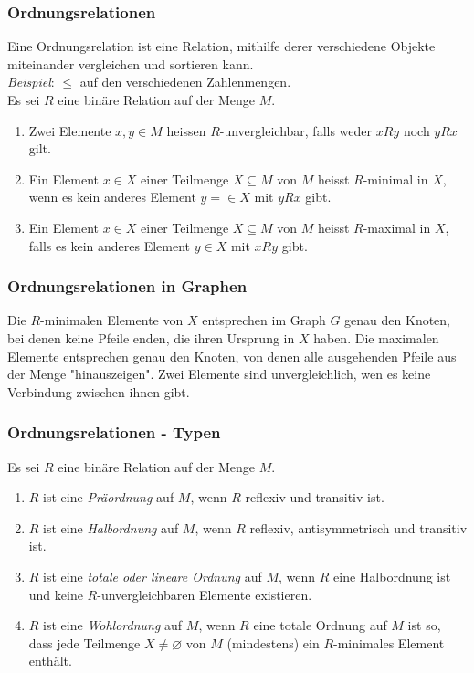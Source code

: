 \subsubsection{Ordnungsrelationen}
Eine Ordnungsrelation ist eine Relation, mithilfe derer verschiedene Objekte miteinander vergleichen und sortieren kann. \\
\textit{Beispiel}: $\leq $ auf den verschiedenen Zahlenmengen.
\\

Es sei $R$ eine binäre Relation auf der Menge $M$.
\begin{enumerate}
	\item Zwei Elemente $x, y \in M$ heissen $R$-unvergleichbar, falls weder $xRy$ noch $yRx$ gilt.
	\item Ein Element $x \in X$ einer Teilmenge $X \subseteq M$ von $M$ heisst $R$-minimal in $X$, wenn es kein anderes Element $y =\in X$ mit $yRx$ gibt.
	\item Ein Element $x \in X$ einer Teilmenge $X \subseteq M$ von $M$ heisst $R$-maximal in $X$, falls es kein anderes Element $y \in X$ mit $xRy$ gibt.
\end{enumerate}

\subsubsection{Ordnungsrelationen in Graphen}
Die $R$-minimalen Elemente von $X$ entsprechen im Graph $G$ genau den Knoten, bei denen keine Pfeile enden, die ihren Ursprung in $X$ haben.
Die maximalen Elemente entsprechen genau den Knoten, von denen alle ausgehenden Pfeile aus der Menge "hinauszeigen". Zwei Elemente sind unvergleichlich, wen es keine Verbindung zwischen ihnen gibt.

\subsubsection{Ordnungsrelationen - Typen}
Es sei $R$ eine binäre Relation auf der Menge $M$.
\begin{enumerate}
	\item $R$ ist eine \textit{Präordnung} auf $M$, wenn $R$ reflexiv und transitiv ist.
	\item $R$ ist eine \textit{Halbordnung} auf $M$, wenn $R$ reflexiv, antisymmetrisch und transitiv ist.
	\item $R$ ist eine \textit{totale oder lineare Ordnung} auf $M$, wenn $R$ eine Halbordnung ist und keine $R$-unvergleichbaren Elemente existieren.
	\item $R$ ist eine \textit{Wohlordnung} auf $M$, wenn $R$ eine totale Ordnung auf $M$ ist so, dass jede Teilmenge $X \neq \varnothing$ von $M$ (mindestens) ein $R$-minimales Element enthält.
\end{enumerate}

